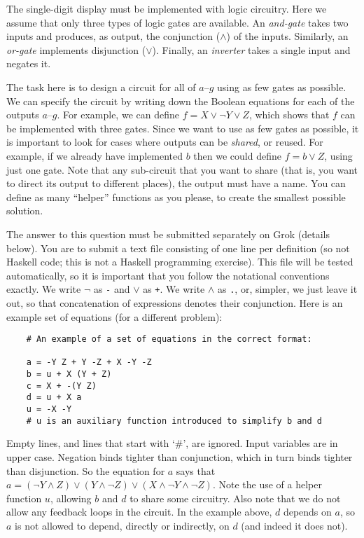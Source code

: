 \documentclass[12pt]{article}
\begin{document}
The single-digit display must be implemented with logic circuitry.
Here we assume that only three types of logic gates are available.
An \emph{and-gate} takes two inputs and produces, as output, the
conjunction ($\land$) of the inputs.
Similarly, an \emph{or-gate} implements disjunction ($\lor$).
Finally, an \emph{inverter} takes a single input and negates it.

The task here is to design a circuit for all of $a$--$g$ using as
few gates as possible.
We can specify the circuit by writing down the Boolean equations
for each of the outputs $a$--$g$.
For example, we can define $f = X \lor \neg Y \lor Z$, which shows
that $f$ can be implemented with three gates.
Since we want to use as few gates as possible, it is important to
look for cases where outputs can be \emph{shared}, or reused.
For example, if we already have implemented $b$ then we could
define $f = b \lor Z$, using just one gate.
Note that any sub-circuit that you want to share (that is, you
want to direct its output to different places), the output must
have a name.
You can define as many ``helper'' functions as you please, to
create the smallest possible solution.

The answer to this question must be submitted separately on Grok
(details below).
You are to submit a text file consisting of one line per
definition (so not Haskell code; this is not a Haskell programming 
exercise).
This file will be tested automatically, so it is important that
you follow the notational conventions exactly.
We write $\neg$ as \texttt{-} and $\lor$ as \texttt{+}.
We write $\land$ as \texttt{.}, or, simpler, we just leave it out,
so that concatenation of expressions denotes their conjunction.
Here is an example set of equations (for a different problem):
\begin{verbatim}
    # An example of a set of equations in the correct format:

    a = -Y Z + Y -Z + X -Y -Z
    b = u + X (Y + Z)
    c = X + -(Y Z)
    d = u + X a
    u = -X -Y
    # u is an auxiliary function introduced to simplify b and d
\end{verbatim}
Empty lines, and lines that start with `\#', are ignored.
Input variables are in upper case.
Negation binds tighter than conjunction, which in
turn binds tighter than disjunction.
So the equation for $a$ says that
$a = (\neg Y \land Z) \lor (Y \land \neg Z) \lor (X \land \neg Y \land \neg Z)$.
Note the use of a helper function $u$, allowing $b$ and $d$ to
share some circuitry.
Also note that we do not allow any feedback loops in the circuit.
In the example above, $d$ depends on $a$, so $a$ is not allowed
to depend, directly or indirectly, on $d$ (and indeed it does not).
\end{document}
